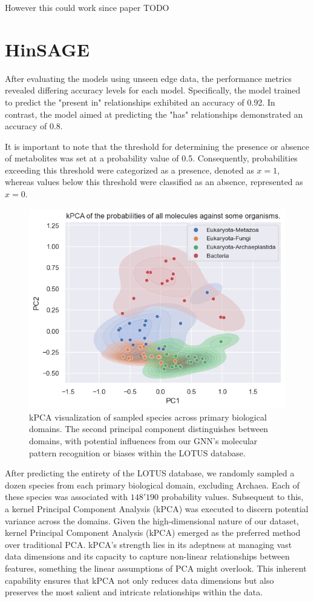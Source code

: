 \documentclass[
11pt, %
oneside, %
english, %
singlespacing, %
headsepline, %
chapterinoneline, %
]{MastersDoctoralThesis} %
\begin{document}
However this could work since paper TODO 

\section{HinSAGE}
After evaluating the models using unseen edge data, the performance metrics revealed differing accuracy levels for each model. Specifically, the model trained to predict the "present in" relationships exhibited an accuracy of 0.92. In contrast, the model aimed at predicting the "has" relationships demonstrated an accuracy of 0.8.

It is important to note that the threshold for determining the presence or absence of metabolites was set at a probability value of 0.5. Consequently, probabilities exceeding this threshold were categorized as a presence, denoted as $x=1$, whereas values below this threshold were classified as an absence, represented as $x=0$.

\begin{figure}[h]
	\centering
	\includegraphics[scale=0.7]{figure/kPCA}
	\caption{kPCA visualization of sampled species across primary biological domains. The second principal component distinguishes between domains, with potential influences from our GNN's molecular pattern recognition or biases within the LOTUS database.}
	\label{fig:kPCA}
\end{figure}

After predicting the entirety of the LOTUS database, we randomly sampled a dozen species from each primary biological domain, excluding Archaea. Each of these species was associated with $148'190$ probability values. Subsequent to this, a kernel Principal Component Analysis (kPCA) was executed to discern potential variance across the domains. Given the high-dimensional nature of our dataset, kernel Principal Component Analysis (kPCA) emerged as the preferred method over traditional PCA. kPCA's strength lies in its adeptness at managing vast data dimensions and its capacity to capture non-linear relationships between features, something the linear assumptions of PCA might overlook. This inherent capability ensures that kPCA not only reduces data dimensions but also preserves the most salient and intricate relationships within the data.
\end{document}
